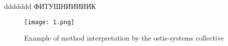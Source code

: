 ddddddd
ФИТУШНИИИИИК 
\usepackage{graphicx}
\usepackage{multicol}
\usepackage{amsmath}
\usepackage{amssymb}
\usepackage[left=20mm, top=17mm, right=16mm, bottom=18mm, ]{geometry}
\usepackage{enumitem}
\usepackage{fancyhdr}
\usepackage[russian]{babel}
\setlength{\columnsep}{0.5cm}
\graphicspath{{files/}}
\pagestyle{fancy}
\fancyhf{}
\renewcommand{\headrulewidth}{0pt}
\fancyfoot[C]{\textbf{\thepage}}

\setcounter{page}{27}
\usepackage{setspace}
\linespread{0.3}


\setcounter{figure}{2}

\begin{figure}
    \centering
   
\texttt{[image: 1.png]}

    \caption{ Example of method interpretation by the ostis-systems collective}
    
  
    \end{figure}
\setlength{\parskip}{0pt}%
